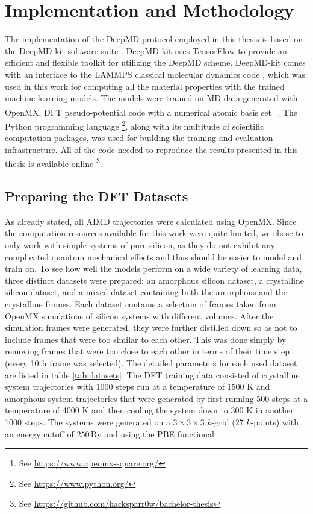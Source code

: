 \chapter{Implementation and Methodology}

The implementation of the DeepMD protocol employed in this thesis is based on
the DeepMD-kit software suite \cite{Wang_DeePMD-kit_A_deep_2018}. DeepMD-kit
uses TensorFlow \cite{tensorflow2015-whitepaper} to provide an efficient and
flexible toolkit for utilizing the DeepMD scheme. DeepMD-kit comes with an
interface to the LAMMPS classical molecular dynamics code \cite{LAMMPS},
which was used in this work for computing all the material properties with the
trained machine learning models. The models were trained on MD data generated
with OpenMX, DFT pseudo-potential code with a numerical atomic basis set
\footnote{
    See \url{https://www.openmx-square.org/}
}. The Python programming language
\footnote{
    See \url{https://www.python.org/}
}, along with its multitude of scientific computation packages, was used for
building the training and evaluation infrastructure. All of the code needed to
reproduce the results presented in this thesis is available online
\footnote{
    See \url{https://github.com/hacksparr0w/bachelor-thesis}
}.

\section{Preparing the DFT Datasets}

As already stated, all AIMD trajectories were calculated using OpenMX. Since
the computation resources available for this work were quite limited, we
chose to only work with simple systems of pure silicon, as they do not
exhibit any complicated quantum mechanical effects and thus should be easier to model and
train on. To see how well the models perform on a wide variety of learning
data, three distinct datasets were prepared: an amorphous silicon dataset, a
crystalline silicon dataset, and a mixed dataset containing both the amorphous
and the crystalline frames. Each dataset contains a selection of frames taken
from OpenMX simulations of silicon systems with different volumes. After the
simulation frames were generated, they were further distilled down so as not
to include frames that were too similar to each other. This was done simply by
removing frames that were too close to each other in terms of their time step
(every 10th frame was selected). The detailed parameters for each used dataset
are listed in table \ref{tab:datasets}. The DFT training data consisted of
crystalline system trajectories with 1000 steps run at a temperature of 1500 K
and amorphous system trajectories that were generated by first running 500
steps at a temperature of 4000 K and then cooling the system down to 300 K in
another 1000 steps. The systems were generated on a $3 \times 3 \times 3$
$k$-grid (27 $k$-points) with an energy cutoff of $250 \, \mathrm{Ry}$ and
using the PBE functional \cite{PhysRevLett.77.3865}.


